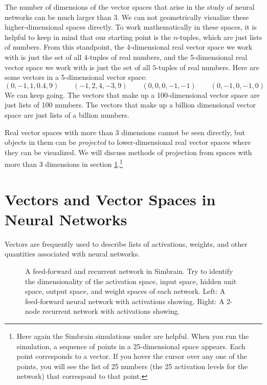    The number of dimensions of the vector spaces that arise in the study of 
neural networks can be much larger than 3. We can not geometrically visualize these higher-dimensional spaces directly. To work mathematically in
these spaces, it is helpful to keep in mind that our starting point is the 
$n$-tuples, which are just lists of numbers. From this standpoint, the 4-dimensional real vector space we work with is just the set of all $4$-tuples of
real numbers, and the 5-dimensional real vector space we work with is just the 
set of all $5$-tuples of real numbers. Here are some vectors in a 5-dimensional vector space:
\begin{equation*}
    (0,-1, 1, 0.4, 9)  \qquad
    (-1, 2, 4, -3, 9)  \qquad 
    (0, 0, 0, -1, -1 ) \qquad
    (0, -1, 0, -1, 0 ) 
\end{equation*}
We can keep going. The vectors that make up a 100-dimensional vector space are 
just lists of 100 numbers. The vectors that make up a billion dimensional 
vector space are just lists of a billion numbers. 

   Real vector spaces with more than 3 dimensions cannot be seen directly, but 
objects in them can be \emph{projected} to lower-dimensional real vector spaces 
where they can be visualized. We will discuss methods of projection from 
spaces with more than 3 dimensions in section \ref{S:dimReduction}.\footnote{Here
again the Simbrain simulations under  are helpful.
When you run the simulation, a sequence of points in a 25-dimensional space 
appears. Each point corresponds to a vector. If you hover the cursor over any
one of the points, you will see the list of 25 numbers (the 25 activation levels
for the network) that correspond to that point.}

\section{Vectors and Vector Spaces in Neural Networks}\label{S:dimReduction}

   Vectors are frequently used to describe lists of activations, weights, and other quantities associated with neural networks. 

\begin{figure}[h]
\centering
{}
\hspace*{1in}
\caption[Simbrain screenshots.]{A feed-forward and recurrent network in Simbrain. Try to identify the dimensionality of the activation space, input space, hidden unit space, output space, and weight spaces of each network. Left: A feed-forward neural network with activations showing. Right: A 2-node recurrent network with activations showing.}
\label{ffRecurrent}
\end{figure}

